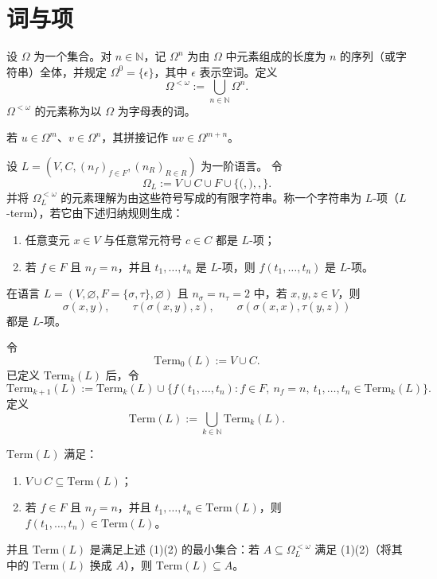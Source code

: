 \documentclass[lang=cn,a4paper,newtx,section]{elegantbook}
\begin{document}
\section{词与项}

\begin{definition}[词（word）]
设 $\Omega$ 为一个集合。对 $n\in\mathbb N$，记 $\Omega^{n}$ 为由 $\Omega$ 中元素组成的长度为 $n$ 的序列（或字符串）全体，并规定 $\Omega^{0}=\{\epsilon\}$，其中 $\epsilon$ 表示空词。定义
\[
  \Omega^{<\omega}:=\bigcup_{n\in\mathbb N}\Omega^{n}.
\]
$\Omega^{<\omega}$ 的元素称为以 $\Omega$ 为字母表的词。
\end{definition}

\begin{definition}[拼接]
若 $u\in\Omega^{m}$、$v\in\Omega^{n}$，其拼接记作 $uv\in\Omega^{m+n}$。
\end{definition}

\begin{definition}[$L$-项]
设 $L=(V,C,(n_f)_{f\in F},(n_R)_{R\in R})$ 为一阶语言。
令
\[
  \Omega_L:=V\cup C\cup F\cup\{\mathtt{(},\mathtt{)},\mathtt{,}\}.
\]
并将 $\Omega_L^{<\omega}$ 的元素理解为由这些符号写成的有限字符串。称一个字符串为 $L$-项（$L$-term），若它由下述归纳规则生成：
\begin{enumerate}
  \item 任意变元 $x\in V$ 与任意常元符号 $c\in C$ 都是 $L$-项；
  \item 若 $f\in F$ 且 $n_f=n$，并且 $t_1,\dots,t_n$ 是 $L$-项，则 $f(t_1,\dots,t_n)$ 是 $L$-项。
\end{enumerate}
\end{definition}

\begin{example}
在语言 $L=(V,\varnothing,F=\{\sigma,\tau\},\varnothing)$ 且 $n_{\sigma}=n_{\tau}=2$ 中，若 $x,y,z\in V$，则
\[
  \sigma(x,y),\qquad \tau(\sigma(x,y),z),\qquad \sigma(\sigma(x,x),\tau(y,z))
\]
都是 $L$-项。
\end{example}

\begin{definition}
令
\[
  \mathrm{Term}_0(L):=V\cup C.
\]
已定义 $\mathrm{Term}_k(L)$ 后，令
\[
  \mathrm{Term}_{k+1}(L):=\mathrm{Term}_k(L)\cup\bigl\{f(t_1,\dots,t_n): f\in F,\ n_f=n,\ t_1,\dots,t_n\in\mathrm{Term}_k(L)\bigr\}.
\]
定义
\[
  \mathrm{Term}(L):=\bigcup_{k\in\mathbb N}\mathrm{Term}_k(L).
\]
\end{definition}

\begin{proposition}
$\mathrm{Term}(L)$ 满足：
\begin{enumerate}
  \item $V\cup C\subseteq \mathrm{Term}(L)$；
  \item 若 $f\in F$ 且 $n_f=n$，并且 $t_1,\dots,t_n\in \mathrm{Term}(L)$，则 $f(t_1,\dots,t_n)\in \mathrm{Term}(L)$。
\end{enumerate}
并且 $\mathrm{Term}(L)$ 是满足上述 (1)(2) 的最小集合：若 $A\subseteq \Omega_L^{<\omega}$ 满足 (1)(2)（将其中的 $\mathrm{Term}(L)$ 换成 $A$），则 $\mathrm{Term}(L)\subseteq A$。
\end{proposition}
\end{document}
